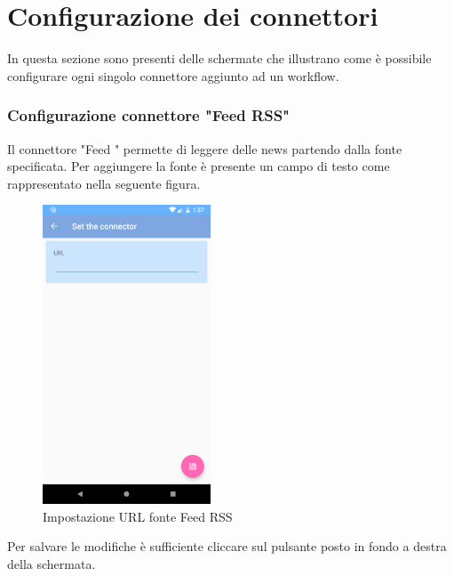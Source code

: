 \clearpage
\section{Configurazione dei connettori}
In questa sezione sono presenti delle schermate che illustrano come è possibile configurare ogni singolo connettore aggiunto ad un workflow.
\label{sec:sec_conf_connettori_app}
\subsubsection{Configurazione connettore "Feed RSS"}
Il connettore "Feed " permette di leggere delle news partendo dalla fonte specificata. Per aggiungere la fonte è presente un campo di testo come rappresentato nella seguente figura.
\begin{figure}[H]
	\centering
	\includegraphics[width=5cm]{../includes/pics/configurazione_feed-rss.png}
	\caption{\label{fig:configurazione_feed-rss}Impostazione URL fonte Feed RSS}
\end{figure}
Per salvare le modifiche è sufficiente cliccare sul pulsante posto in fondo a destra della schermata.
